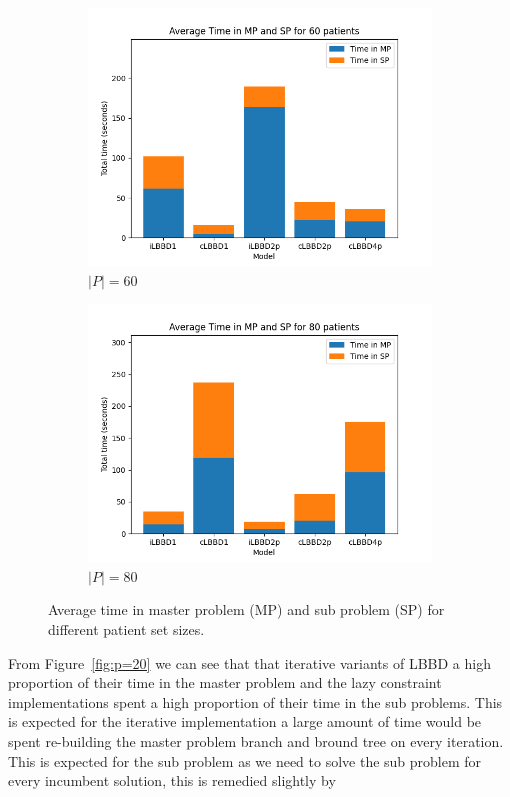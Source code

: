 \begin{figure}
\begin{subfigure}[b]{0.45\textwidth}
        \includegraphics[width=\textwidth]{plots/(60_timeinMPSP).png}
        \caption{$|P|=60$}\label{fig:p=60}
    \end{subfigure}
    \hfill
    \begin{subfigure}[b]{0.45\textwidth}
        \centering
        \includegraphics[width=\textwidth]{plots/(80_timeinMPSP).png}
        \caption{$|P|=80$}\label{fig:p=80}
    \end{subfigure}
    \caption{Average time in master problem (MP) and sub problem (SP) for different patient set sizes.}\label{fig:MPSPtime}
\end{figure}

From Figure~\ref{fig:p=20} we can see that that iterative variants of LBBD a high proportion of their time in the master problem and the lazy constraint implementations spent a high proportion of their time in the sub problems. This is expected for the iterative implementation a large amount of time would be spent re-building the master problem branch and bround tree on every iteration. This is expected for the sub problem as we need to solve the sub problem for every incumbent solution, this is remedied slightly by 